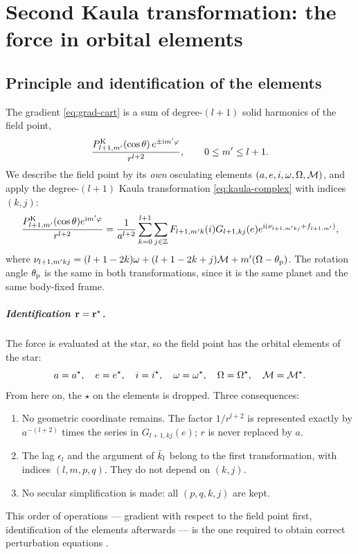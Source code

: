 \chapter{Second Kaula transformation: the force in orbital elements}\label{ch:second}

\section{Principle and identification of the elements}
The gradient \eqref{eq:grad-cart} is a sum of degree-$(l+1)$ solid harmonics of the field point,
\[
  \frac{P^{\mathrm K}_{l+1,m'}(\cos\theta)\,e^{\pm\mathrm{i} m'\varphi}}{r^{l+2}},\qquad 0\le m'\le l+1.
\]
We describe the field point by its \emph{own} osculating elements $(a,e,i,\omega,\Omega,\mathcal{M})$, and apply the degree-$(l+1)$ Kaula transformation \eqref{eq:kaula-complex} with indices $(k,j)$:
\begin{equation}
  \frac{P^{\mathrm K}_{l+1,m'}(\cos\theta)e^{\mathrm{i} m'\varphi}}{r^{l+2}}=\frac{1}{a^{l+2}}\sum_{k=0}^{l+1}\sum_{j\in\mathbb Z}F_{l+1,m'k}(i)G_{l+1,kj}(e)e^{\mathrm{i}(\nu_{l+1,m'kj}+f_{l+1,m'})}, \label{eq:second-kaula}
\end{equation}
where $\nu_{l+1,m'kj}=(l+1-2k)\omega+(l+1-2k+j)\mathcal{M}+m'(\Omega-\theta_{\mathrm p})$. The rotation angle $\theta_{\mathrm p}$ is the same in both transformations, since it is the same planet and the same body-fixed frame.

\paragraph{Identification $\mathbf r=\mathbf r^\star$.} The force is evaluated at the star, so the field point has the orbital elements of the star:
\begin{equation}
  a=a^\star,\quad e=e^\star,\quad i=i^\star,\quad \omega=\omega^\star,\quad \Omega=\Omega^\star,\quad \mathcal{M}=\mathcal{M}^\star. \label{eq:identification}
\end{equation}
From here on, the $\star$ on the elements is dropped. Three consequences:
\begin{enumerate}
  \item No geometric coordinate remains. The factor $1/r^{l+2}$ is represented exactly by $a^{-(l+2)}$ times the series in $G_{l+1,kj}(e)$; $r$ is never replaced by $a$.
  \item The lag $\epsilon_l$ and the argument of $\bar k_l$ belong to the first transformation, with indices $(l,m,p,q)$. They do not depend on $(k,j)$.
  \item No secular simplification is made: all $(p,q,k,j)$ are kept.
\end{enumerate}
This order of operations — gradient with respect to the field point first, identification of the elements afterwards — is the one required to obtain correct perturbation equations \citep{EfroimskyMakarov2013}.

